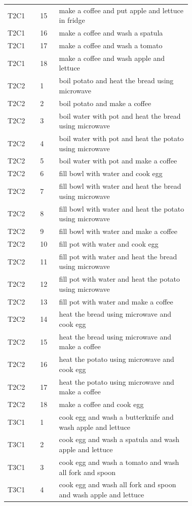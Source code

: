 \documentclass[letterpaper,10pt,onecolumn]{IEEEtran}
\begin{document}
{\begin{longtable}{@{}llp{0.72\linewidth}@{}}
T2C1 & 15 & make a coffee and put apple and lettuce in fridge \\
T2C1 & 16 & make a coffee and wash a spatula \\
T2C1 & 17 & make a coffee and wash a tomato \\
T2C1 & 18 & make a coffee and wash apple and lettuce \\
\midrule
T2C2 & 1 & boil potato and heat the bread using microwave \\
T2C2 & 2 & boil potato and make a coffee \\
T2C2 & 3 & boil water with pot and heat the bread using microwave \\
T2C2 & 4 & boil water with pot and heat the potato using microwave \\
T2C2 & 5 & boil water with pot and make a coffee \\
T2C2 & 6 & fill bowl with water and cook egg \\
T2C2 & 7 & fill bowl with water and heat the bread using microwave \\
T2C2 & 8 & fill bowl with water and heat the potato using microwave \\
T2C2 & 9 & fill bowl with water and make a coffee \\
T2C2 & 10 & fill pot with water and cook egg \\
T2C2 & 11 & fill pot with water and heat the bread using microwave \\
T2C2 & 12 & fill pot with water and heat the potato using microwave \\
T2C2 & 13 & fill pot with water and make a coffee \\
T2C2 & 14 & heat the bread using microwave and cook egg \\
T2C2 & 15 & heat the bread using microwave and make a coffee \\
T2C2 & 16 & heat the potato using microwave and cook egg \\
T2C2 & 17 & heat the potato using microwave and make a coffee \\
T2C2 & 18 & make a coffee and cook egg \\
\midrule
T3C1 & 1 & cook egg and wash a butterknife and wash apple and lettuce \\
T3C1 & 2 & cook egg and wash a spatula and wash apple and lettuce \\
T3C1 & 3 & cook egg and wash a tomato and wash all fork and spoon \\
T3C1 & 4 & cook egg and wash all fork and spoon and wash apple and lettuce \\

\end{longtable}}
\end{document}
